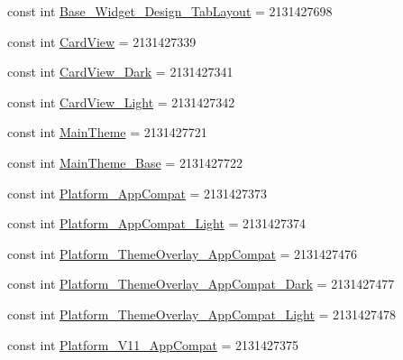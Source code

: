 \begin{DoxyCompactItemize}
\item 
const int \mbox{\hyperlink{class_f_w_p_s___app_1_1_droid_1_1_resource_1_1_style_a54de63806f36761c37d63a6e00b113d3}{Base\+\_\+\+Widget\+\_\+\+Design\+\_\+\+Tab\+Layout}} = 2131427698
\item 
const int \mbox{\hyperlink{class_f_w_p_s___app_1_1_droid_1_1_resource_1_1_style_ab06bd19270a3c90e7fb604416bdfb3ad}{Card\+View}} = 2131427339
\item 
const int \mbox{\hyperlink{class_f_w_p_s___app_1_1_droid_1_1_resource_1_1_style_a9baad99dc3ae3b572b2bc3acd82cf20d}{Card\+View\+\_\+\+Dark}} = 2131427341
\item 
const int \mbox{\hyperlink{class_f_w_p_s___app_1_1_droid_1_1_resource_1_1_style_abd596a7ac232708f3e15b26a0cf24bb6}{Card\+View\+\_\+\+Light}} = 2131427342
\item 
const int \mbox{\hyperlink{class_f_w_p_s___app_1_1_droid_1_1_resource_1_1_style_a0d504d1576eec248e4739c268627f30f}{Main\+Theme}} = 2131427721
\item 
const int \mbox{\hyperlink{class_f_w_p_s___app_1_1_droid_1_1_resource_1_1_style_a2ddf30cca6ff762b9379ff68531bc7cf}{Main\+Theme\+\_\+\+Base}} = 2131427722
\item 
const int \mbox{\hyperlink{class_f_w_p_s___app_1_1_droid_1_1_resource_1_1_style_a271f9572c1335008bb236724849fb2bf}{Platform\+\_\+\+App\+Compat}} = 2131427373
\item 
const int \mbox{\hyperlink{class_f_w_p_s___app_1_1_droid_1_1_resource_1_1_style_ad94c7cf28a90f44a6dade82ab03592a0}{Platform\+\_\+\+App\+Compat\+\_\+\+Light}} = 2131427374
\item 
const int \mbox{\hyperlink{class_f_w_p_s___app_1_1_droid_1_1_resource_1_1_style_a709aeea778aa05ca4922d6f8a07153a9}{Platform\+\_\+\+Theme\+Overlay\+\_\+\+App\+Compat}} = 2131427476
\item 
const int \mbox{\hyperlink{class_f_w_p_s___app_1_1_droid_1_1_resource_1_1_style_af02c3b891d1a85c06d0516fdcc927cd2}{Platform\+\_\+\+Theme\+Overlay\+\_\+\+App\+Compat\+\_\+\+Dark}} = 2131427477
\item 
const int \mbox{\hyperlink{class_f_w_p_s___app_1_1_droid_1_1_resource_1_1_style_a46e4331f7223da225b4a09b0d91f077d}{Platform\+\_\+\+Theme\+Overlay\+\_\+\+App\+Compat\+\_\+\+Light}} = 2131427478
\item 
const int \mbox{\hyperlink{class_f_w_p_s___app_1_1_droid_1_1_resource_1_1_style_a205970d7773d248cf0a71eb9792693ed}{Platform\+\_\+\+V11\+\_\+\+App\+Compat}} = 2131427375
\item 

\end{DoxyCompactItemize}

